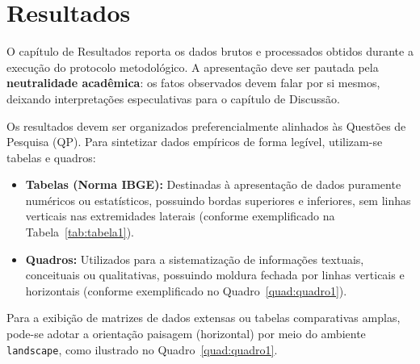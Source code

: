 \chapter{Resultados}
\label{chap:resultados}

O capítulo de Resultados reporta os dados brutos e processados obtidos durante a execução do protocolo metodológico. A apresentação deve ser pautada pela \textbf{neutralidade acadêmica}: os fatos observados devem falar por si mesmos, deixando interpretações especulativas para o capítulo de Discussão.

Os resultados devem ser organizados preferencialmente alinhados às Questões de Pesquisa (QP). Para sintetizar dados empíricos de forma legível, utilizam-se tabelas e quadros:

\begin{itemize}
    \item \textbf{Tabelas (Norma IBGE):} Destinadas à apresentação de dados puramente numéricos ou estatísticos, possuindo bordas superiores e inferiores, sem linhas verticais nas extremidades laterais (conforme exemplificado na Tabela~\ref{tab:tabela1}).
    \item \textbf{Quadros:} Utilizados para a sistematização de informações textuais, conceituais ou qualitativas, possuindo moldura fechada por linhas verticais e horizontais (conforme exemplificado no Quadro~\ref{quad:quadro1}).
\end{itemize}



Para a exibição de matrizes de dados extensas ou tabelas comparativas amplas, pode-se adotar a orientação paisagem (horizontal) por meio do ambiente \texttt{landscape}, como ilustrado no Quadro~\ref{quad:quadro1}.

